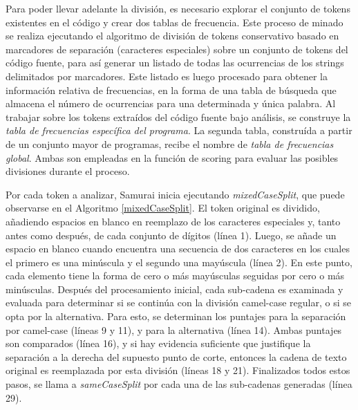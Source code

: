 Para poder llevar adelante la división, es necesario explorar el conjunto de tokens existentes en el código y crear dos tablas de frecuencia.
Este proceso de minado se realiza ejecutando el algoritmo de división de tokens conservativo basado en marcadores de separación (caracteres especiales) sobre un conjunto de tokens del código fuente, para así generar un listado de todas las ocurrencias de los strings delimitados por marcadores.
Este listado es luego procesado para obtener la información relativa de frecuencias, en la forma de una tabla de búsqueda que almacena el número de ocurrencias para una determinada y única palabra.
Al trabajar sobre los tokens extraídos del código fuente bajo análisis, se construye  la \textit{tabla de frecuencias específica del programa}.
La segunda tabla, construída a partir de un conjunto mayor de programas, recibe el nombre de \textit{tabla de frecuencias global}.
Ambas son empleadas en la función de scoring para evaluar las posibles divisiones durante el proceso.

Por cada token a analizar, Samurai inicia ejecutando \textit{mixedCaseSplit}, que puede observarse en el Algoritmo \ref{mixedCaseSplit}.
El token original es dividido, añadiendo espacios en blanco en reemplazo de los caracteres especiales y, tanto antes como después, de cada conjunto de dígitos (línea 1).
Luego, se añade un espacio en blanco cuando encuentra una secuencia de dos caracteres en los cuales el primero es una minúscula y el segundo una mayúscula (línea 2).
En este punto, cada elemento tiene la forma de cero o más mayúsculas seguidas por cero o más minúsculas.
Después del procesamiento inicial, cada sub-cadena es examinada y evaluada para determinar si se continúa con la división camel-case regular, o si se opta por la alternativa.
Para esto, se determinan los puntajes para la separación por camel-case (líneas 9 y 11), y para la alternativa (línea 14).
Ambas puntajes son comparados (línea 16), y si hay evidencia suficiente que justifique la separación a la derecha del supuesto punto de corte, entonces la cadena de texto original es reemplazada por esta división (líneas 18 y 21).
Finalizados todos estos pasos, se llama a \textit{sameCaseSplit} por cada una de las sub-cadenas generadas (línea 29).


